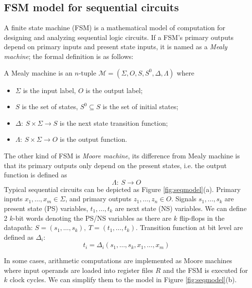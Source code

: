 \subsection{FSM model for sequential circuits}
A finite state machine (FSM) is a mathematical model of computation for designing and analyzing sequential logic 
circuits. If a FSM's primary outputs depend on primary inputs and present state inputs, it is named as a \textit{Mealy machine};
the formal definition is as follows:
\begin{Definition}
A Mealy machine is an $n$-tuple $\mathcal M = (\Sigma,O,S,S^0,\Delta,\Lambda)$ where
\begin{itemize}
\item $\Sigma$ is the input label, $O$ is the output label;
\item $S$ is the set of states, $S^0\subseteq S$ is the set of initial states;
\item $\Delta:\ S\times\Sigma\to S$ is the next state transition function;
\item $\Lambda:\ S\times\Sigma\to O$ is the output function.
\end{itemize}
\end{Definition}
The other kind of FSM is \textit{Moore machine}, its difference from Mealy machine is that
its primary outputs only depend on the present states, i.e. the output function is defined as
$$\Lambda:\ S \to O$$
Typical sequential circuits can be depicted as Figure \ref{fig:seqmodel}(a). Primary inputs
$x_1,\dots,x_m \in \Sigma$, and primary outputs $z_1,\dots,z_n\in O$. Signals $s_1,\dots,s_k$ 
are present state (PS) variables, $t_1,\dots,t_k$ are next state (NS) variables.
We can define 2 $k$-bit words denoting the PS/NS variables as there are $k$ flip-flops
in the datapath: $S = (s_1,\dots,s_k), ~T=(t_1,\dots,t_k)$. Transition function
at bit level are defined as $\Delta_i$: 
$$t_i = \Delta_i(s_1,\dots,s_k,x_1,\dots,x_m)$$
\begin{figure}[H]
\end{figure}
In some cases, arithmetic computations are implemented as Moore machines where input operands
are loaded into register files $R$ and the FSM is executed for $k$ clock cycles.
We can simplify them to the model in Figure \ref{fig:seqmodel}(b).

